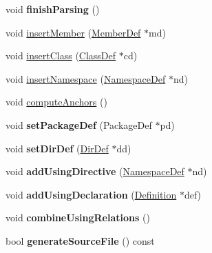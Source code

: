 \begin{DoxyCompactItemize}
\item 
\hypertarget{class_file_def_a2b9b94a5e993877c10be053a1f50741b}{void {\bfseries finish\-Parsing} ()}\label{class_file_def_a2b9b94a5e993877c10be053a1f50741b}

\item 
void \hyperlink{class_file_def_a107a8239a6007765234a4f336ae11bbd}{insert\-Member} (\hyperlink{class_member_def}{Member\-Def} $\ast$md)
\item 
void \hyperlink{class_file_def_abdd378f66d1535111afbe9ab9dd17bec}{insert\-Class} (\hyperlink{class_class_def}{Class\-Def} $\ast$cd)
\item 
void \hyperlink{class_file_def_a778cb0bbf18f1e3b863cf9509d9b4987}{insert\-Namespace} (\hyperlink{class_namespace_def}{Namespace\-Def} $\ast$nd)
\item 
void \hyperlink{class_file_def_a6bd971b93180dba29a797a5472362d17}{compute\-Anchors} ()
\item 
\hypertarget{class_file_def_a1a12d2cc3797cece82b59f1ecfcb9e66}{void {\bfseries set\-Package\-Def} (Package\-Def $\ast$pd)}\label{class_file_def_a1a12d2cc3797cece82b59f1ecfcb9e66}

\item 
\hypertarget{class_file_def_a085b7588aeb04c36f37b9c7309b05155}{void {\bfseries set\-Dir\-Def} (\hyperlink{class_dir_def}{Dir\-Def} $\ast$dd)}\label{class_file_def_a085b7588aeb04c36f37b9c7309b05155}

\item 
\hypertarget{class_file_def_af8ebd51a7679e1ac3649bbb72f629f34}{void {\bfseries add\-Using\-Directive} (\hyperlink{class_namespace_def}{Namespace\-Def} $\ast$nd)}\label{class_file_def_af8ebd51a7679e1ac3649bbb72f629f34}

\item 
\hypertarget{class_file_def_a050db52ff34cd330ec6d84f62eae5b04}{void {\bfseries add\-Using\-Declaration} (\hyperlink{class_definition}{Definition} $\ast$def)}\label{class_file_def_a050db52ff34cd330ec6d84f62eae5b04}

\item 
\hypertarget{class_file_def_ae982cd945c697ac5324aa95785b23f55}{void {\bfseries combine\-Using\-Relations} ()}\label{class_file_def_ae982cd945c697ac5324aa95785b23f55}

\item 
\hypertarget{class_file_def_ad7d131c27ff33e46fdb25ad03142bdf0}{bool {\bfseries generate\-Source\-File} () const }\label{class_file_def_ad7d131c27ff33e46fdb25ad03142bdf0}


\end{DoxyCompactItemize}
